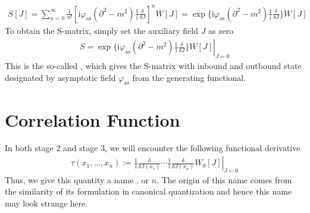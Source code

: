 \documentclass[letterpaper,10pt,english]{sphinxmanual}
\begin{document}
\begin{equation*}
\begin{split}S[J] = \sum_{n=0}^\infty\frac{1}{n!}\left[\mathrm{i}\varphi_{\text{as}}(\partial^2\!\!-\!m^2)\frac{1}{\mathrm{i}}\!\frac{\delta}{\delta J}\right]^nW[J] = \exp\{\mathrm{i}\varphi_{\text{as}}(\partial^2\!\!-\!m^2)\frac{1}{\mathrm{i}}\!\frac{\delta}{\delta J}\}W[J]\end{split}
\end{equation*}
To obtain the S-matrix, simply set the auxiliary field \(J\) as zero
\begin{equation*}
\begin{split}S = \left.\exp\{\mathrm{i}\varphi_{\text{as}}(\partial^2\!\!-\!m^2)\frac{1}{\mathrm{i}}\!\frac{\delta}{\delta J}\}W[J]\right|_{J=0}\end{split}
\end{equation*}
This is the so-called , which gives the S-matrix with inbound and outbound state designated by asymptotic field \(\varphi_{\text{as}}\) from the generating functional.


\section{Correlation Function}
\label{\detokenize{qft_corr::doc}}\label{\detokenize{qft_corr:correlation-function}}
In both stage 2 and stage 3, we will encounter the following functional derivative
\begin{equation*}
\begin{split}\tau(x_1,\ldots,x_n) := \left.\frac{1}{\mathrm{i}}\!\frac{\delta}{\delta J(x_1)}\cdots\frac{1}{\mathrm{i}}\!\frac{\delta}{\delta J(x_n)}W_0[J]\right|_{J=0}\end{split}
\end{equation*}
Thus, we give this quantity a name , or \(n\). The origin of this name comes from the similarity of its formulation in canonical quantization and hence this name may look strange here.
\end{document}

